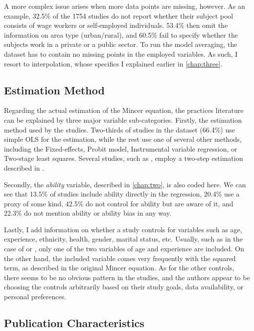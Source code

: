 A more complex issue arises when more data points are missing, however. As an example, 32.5\% of the 1754 studies do not report whether their subject pool consists of wage workers or self-employed individuals. 53.4\% then omit the information on area type (urban/rural), and 60.5\% fail to specify whether the subjects work in a private or a public sector. To run the model averaging, the dataset has to contain no missing points in the employed variables. As such, I resort to interpolation, whose specifics I explained earlier in \autoref{chap:three}.

\subsection{Estimation Method}
\label{subsec:estim_method}

Regarding the actual estimation of the Mincer equation, the practices literature can be explained by three major variable sub-categories. Firstly, the estimation method used by the studies. Two-thirds of studies in the dataset (66.4\%) use simple \ac{OLS} for the estimation, while the rest use one of several other methods, including the Fixed-effects, Probit model, Instrumental variable regression, or Two-stage least squares. Several studies, such as \cite{debrauw2008reconciling}, employ a two-step estimation described in \cite{heckman1974empirical}.

Secondly, the \textit{ability} variable, described in \autoref{chap:two}, is also coded here. We can see that 13.5\% of studies include ability directly in the regression, 20.4\% use a proxy of some kind, 42.5\% do not control for ability but are aware of it, and 22.3\% do not mention ability or ability bias in any way.

Lastly, I add information on whether a study controls for variables such as age, experience, ethnicity, health, gender, marital status, etc. Usually, such as in the case of \cite{girma2005heterogeneity} or \cite{harmon2002returns}, only one of the two variables of age and experience are included. On the other hand, the included variable comes very frequently with the squared term, as described in the original Mincer equation. As for the other controls, there seems to be no obvious pattern in the studies, and the authors appear to be choosing the controls arbitrarily based on their study goals, data availability, or personal preferences.

\subsection{Publication Characteristics}
\label{subsec:pub_characteristics}

